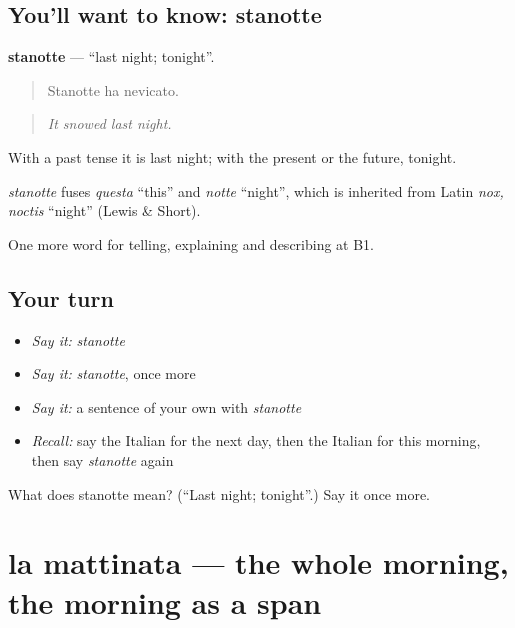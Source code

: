 \subsection*{You'll want to know: stanotte}
\textbf{stanotte} — \textquotedblleft{}last night; tonight\textquotedblright{}.

\begin{quote}
Stanotte ha nevicato.
\end{quote}

\begin{quote}
\emph{It snowed last night.}
\end{quote}

With a past tense it is last night; with the present or the future, tonight.

\begin{cousinweb}
\emph{stanotte} fuses \emph{questa} \textquotedblleft{}this\textquotedblright{} and \emph{notte} \textquotedblleft{}night\textquotedblright{}, which is inherited from Latin \emph{nox, noctis} \textquotedblleft{}night\textquotedblright{} (Lewis \& Short).
\end{cousinweb}

\begin{grammarlens}[title={What you've built}]
One more word for telling, explaining and describing at B1.
\end{grammarlens}

\subsection*{Your turn}
\begin{itemize}
\raggedright
  \item \emph{Say it:} \emph{stanotte}
  \item \emph{Say it:} \emph{stanotte}, once more
  \item \emph{Say it:} a sentence of your own with \emph{stanotte}
  \item \emph{Recall:} say the Italian for the next day, then the Italian for this morning, then say \emph{stanotte} again
\end{itemize}

\begin{tcolorbox}[breakable,colback=teal!4,colframe=teal!35!black,title={Before you move on}]
What does stanotte mean? (\textquotedblleft{}Last night; tonight\textquotedblright{}.) Say it once more.
\end{tcolorbox}
\section[la mattinata]{la mattinata — the whole morning, the morning as a span}

